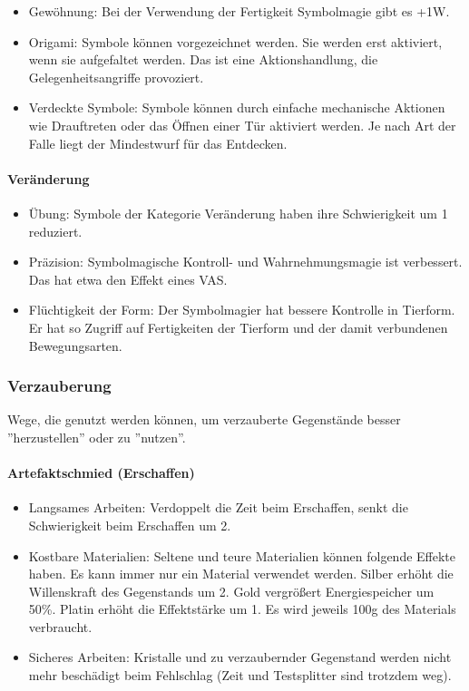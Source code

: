 \documentclass{article}
\begin{document}
\begin{itemize}
\item Gewöhnung: Bei der Verwendung der Fertigkeit Symbolmagie gibt es +1W.
\item Origami: Symbole können vorgezeichnet werden. Sie werden erst aktiviert, wenn sie aufgefaltet werden. Das ist eine Aktionshandlung, die Gelegenheitsangriffe provoziert.
\item Verdeckte Symbole: Symbole können durch einfache mechanische Aktionen wie Drauftreten oder das Öffnen einer Tür aktiviert werden. Je nach Art der Falle liegt der Mindestwurf für das Entdecken.
\end{itemize}

\paragraph{Veränderung}

\begin{itemize}
\item Übung: Symbole der Kategorie Veränderung haben ihre Schwierigkeit um 1 reduziert.
\item Präzision: Symbolmagische Kontroll- und Wahrnehmungsmagie ist verbessert. Das hat etwa den Effekt eines VAS.
\item Flüchtigkeit der Form: Der Symbolmagier hat bessere Kontrolle in Tierform. Er hat so Zugriff auf Fertigkeiten der Tierform und der damit verbundenen Bewegungsarten.
\end{itemize}

\subsubsection{Verzauberung}

Wege, die genutzt werden können, um verzauberte Gegenstände besser ''herzustellen'' oder zu ''nutzen''.

\paragraph{Artefaktschmied (Erschaffen)}

\begin{itemize}
\item Langsames Arbeiten: Verdoppelt die Zeit beim Erschaffen, senkt die Schwierigkeit beim Erschaffen um 2.
\item Kostbare Materialien: Seltene und teure Materialien können folgende Effekte haben. Es kann immer nur ein Material verwendet werden. Silber erhöht die Willenskraft des Gegenstands um 2. Gold vergrößert Energiespeicher um 50\%. Platin erhöht die Effektstärke um 1. Es wird jeweils 100g des Materials verbraucht.
\item Sicheres Arbeiten: Kristalle und zu verzaubernder Gegenstand werden nicht mehr beschädigt beim Fehlschlag (Zeit und Testsplitter sind trotzdem weg).
\end{itemize}
\end{document}

